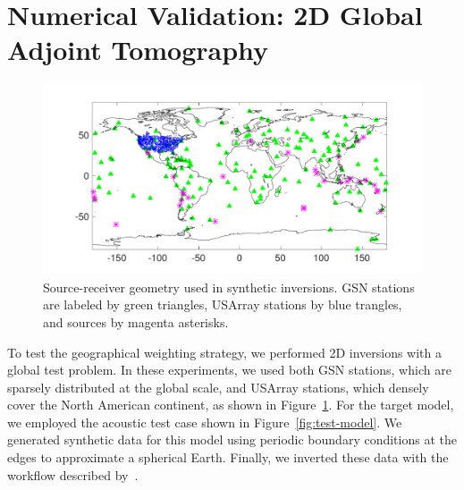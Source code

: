 \section{Numerical Validation: 2D Global Adjoint Tomography}

\begin{figure}
    \centering
    \begin{minipage}[t]{.9\columnwidth}
    \includegraphics[width=.95\textwidth]{ch-weighting/figures/network.pdf}  %
    \end{minipage}
  \caption[source-receiver geometry used in synthetic inversions]
  {\small{Source-receiver geometry used in synthetic inversions.  
GSN stations are labeled by green triangles, USArray stations by blue trangles, and sources 
by magenta asterisks.
}}
\label{fig:test-src-sta}
\end{figure}

To test the geographical weighting strategy, 
we performed 2D inversions with a global test problem.  In these experiments, we used both GSN stations, which are sparsely distributed 
at the global scale, and USArray stations, which densely cover the North American continent, as shown in Figure~\ref{fig:test-src-sta}.
For the target model, we employed the acoustic test case  shown in Figure~\ref{fig:test-model}.  We generated synthetic data for this model using periodic boundary 
conditions at the edges to approximate a spherical Earth.  Finally, we inverted these data  with the workflow described by~\cite{Modrak2018}.  

